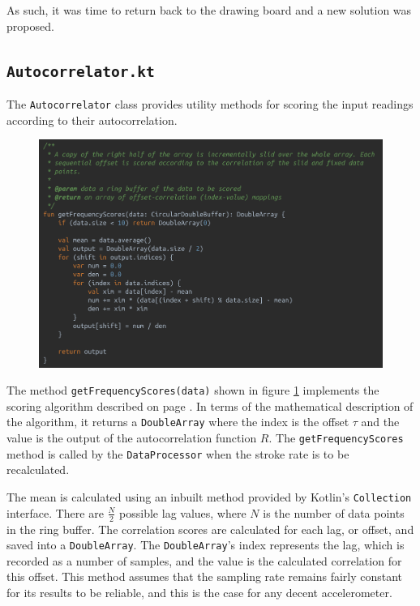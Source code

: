 \documentclass[11pt,twoside,a4paper]{report}
\begin{document}
As such, it was time to return back to the drawing board and a new solution was proposed.

\subsection{\texttt{Autocorrelator.kt}}

The \texttt{Autocorrelator} class provides utility methods for scoring the input readings according to their autocorrelation.

\begin{figure}[h!]
  \centering
  \includegraphics[width=1.0\textwidth]{code-autocorrelator-getFrequencyScores.png}
  \caption{}
  \label{fig:getFrequencyScores}
\end{figure}

The method \texttt{getFrequencyScores(data)} shown in figure \ref{fig:getFrequencyScores} implements the scoring algorithm described on page \pageref{par:autoCorAlgo}. In terms of the mathematical description of the algorithm, it returns a \texttt{DoubleArray} where the index is the offset $\tau$ and the value is the output of the autocorrelation function $R$. The \texttt{getFrequencyScores} method is called by the \texttt{DataProcessor} when the stroke rate is to be recalculated.

The mean is calculated using an inbuilt method provided by Kotlin's \texttt{Collection} interface.
There are $\frac{N}{2}$ possible lag values, where $N$ is the number of data points in the ring buffer.
The correlation scores are calculated for each lag, or offset, and saved into a \texttt{DoubleArray}. The \texttt{DoubleArray}'s index represents the lag, which is recorded as a number of samples, and the value is the calculated correlation for this offset. This method assumes that the sampling rate remains fairly constant for its results to be reliable, and this is the case for any decent accelerometer.
\end{document}
